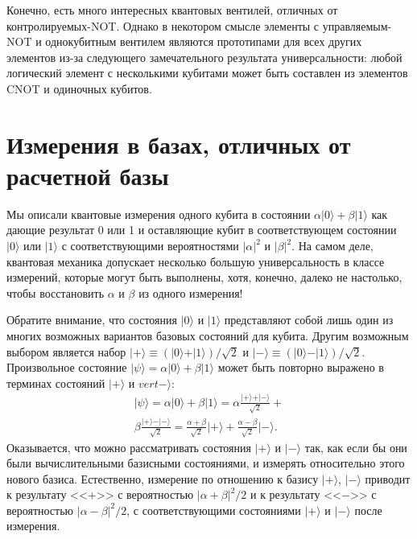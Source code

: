 \begin{multicols}{2}
{        Конечно, есть много интересных квантовых вентилей, отличных от контролируемых-NOT.
        Однако в некотором смысле элементы с управляемым-NOT и однокубитным вентилем являются прототипами для всех
        других элементов из-за следующего замечательного результата универсальности: любой
        логический элемент с несколькими кубитами может быть составлен из элементов CNOT и одиночных кубитов.
    }\\
    \section*{Измерения в базах, отличных от расчетной базы}
    \normalsize{
        Мы описали квантовые измерения одного кубита в состоянии $\alpha\vert0\rangle+\beta\vert1\rangle$ как
        дающие результат 0 или 1 и оставляющие кубит в соответствующем состоянии $\vert0\rangle$ или $\vert1\rangle$ 
        с соответствующими вероятностями $\vert\alpha\vert^2$ и $\vert\beta\vert^2$. На самом деле, квантовая механика допускает несколько
        большую универсальность в классе измерений, которые могут быть выполнены, хотя, конечно, далеко не настолько, чтобы восстановить $\alpha$ и $\beta$ из одного измерения!

        Обратите внимание, что состояния $\vert0\rangle$ и $\vert1\rangle$ представляют собой лишь один из многих возможных вариантов базовых
        состояний для кубита. Другим возможным выбором является набор $\vert+\rangle\equiv(\vert0\rangle+\vert1\rangle)/\sqrt2$ и $\vert-\rangle\equiv(\vert0\rangle-\vert1\rangle)/\sqrt2$.
        Произвольное состояние $\vert\psi\rangle=\alpha\vert0\rangle+\beta\vert1\rangle$ может быть повторно выражено в терминах состояний $\vert+\rangle$ и $vert-\rangle$:
        \begin{equation}
            \begin{split}
                \vert\psi\rangle=\alpha\vert0\rangle+\beta\vert1\rangle=\alpha\frac{\vert+\rangle+\vert-\rangle}{\sqrt2}+\\\beta\frac{\vert+\rangle-\vert-\rangle}{\sqrt2}=\frac{\alpha+\beta}{\sqrt2}\vert+\rangle+\frac{\alpha-\beta}{\sqrt2}\vert-\rangle.
            \end{split}
        \end{equation}
        Оказывается, что можно рассматривать состояния $\vert+\rangle$ и $\vert-\rangle$ так, как если бы они были вычислительными базисными состояниями, и измерять относительно этого нового базиса. 
        Естественно, измерение по отношению к базису $\vert+\rangle$, $\vert-\rangle$ приводит к результату <<$+$>> с вероятностью $\vert\alpha+\beta\vert^2/2$ 
        и к результату <<$-$>> с вероятностью $\vert\alpha-\beta\vert^2/2$, с соответствующими состояниями $\vert+\rangle$ и $\vert-\rangle$ после измерения.
        
}
\end{multicols}
